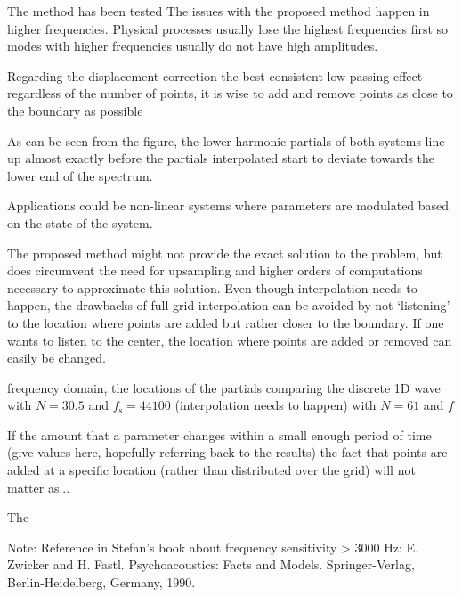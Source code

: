 The method has been tested The issues with the proposed method happen in higher frequencies. Physical processes usually lose the highest frequencies first so modes with higher frequencies usually do not have high amplitudes.

Regarding the displacement correction the best consistent low-passing effect regardless of the number of points, it is wise to add and remove points as close to the boundary as possible

As can be seen from the figure, the lower harmonic partials of both systems line up almost exactly before the partials interpolated start to deviate towards the lower end of the spectrum.


Applications could be non-linear systems where parameters are modulated based on the state of the system. 

The proposed method might not provide the exact solution to the problem, but does circumvent the need for upsampling and higher orders of computations necessary to approximate this solution. Even though interpolation needs to happen, the drawbacks of full-grid interpolation can be avoided by not `listening' to the location where points are added but rather closer to the boundary. If one wants to listen to the center, the location where points are added or removed can easily be changed.


frequency domain, the locations of the partials comparing the discrete 1D wave with $N = 30.5$ and $f_\text{s} = 44100$ (interpolation needs to happen) with $N = 61$ and $f$ 

If the amount that a parameter changes within a small enough period of time (give values here, hopefully referring back to the results) the fact that points are added at a specific location (rather than distributed over the grid) will not matter as... 

The 


Note: Reference in Stefan's book about frequency sensitivity > 3000 Hz: E. Zwicker and H. Fastl. Psychoacoustics: Facts and Models. Springer-Verlag, Berlin-Heidelberg,
Germany, 1990.
